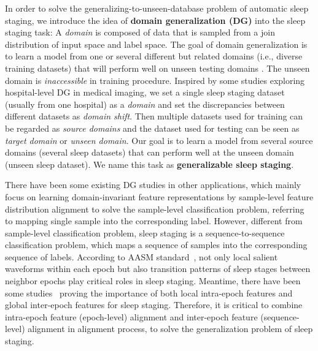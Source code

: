 \documentclass[letterpaper]{article} %
\begin{document}
	In order to solve the generalizing-to-unseen-database problem of automatic sleep staging, we introduce the idea of \textbf{domain generalization (DG)} into the sleep staging task:
	A \textit{domain} is composed of data that is sampled from a join distribution of input space and label space.
	The goal of domain generalization is to learn a model from one or several different but related domains (i.e., diverse training datasets) that will perform well on unseen testing domains \citep{wang2022generalizing}.
	The unseen domain is \textit{inaccessible} in training procedure.
	Inspired by some studies \citep{koh2021wilds, robey2021model} exploring hospital-level DG in medical imaging,
	we set a single sleep staging dataset (usually from one hospital) as a \textit{domain} and set the discrepancies between different datasets as \textit{domain shift}.
	Then multiple datasets used for training can be regarded as \textit{source domains} and the dataset used for testing can be seen as \textit{target domain} or \textit{unseen domain}.
	Our goal is to learn a model from several source domains (several sleep datasets) that can perform well at the unseen domain (unseen sleep dataset). We name this task as \textbf{generalizable sleep staging}.
	
	There have been some existing DG studies \citep{muandet2013domain, li2018domain, li2018dg, matsuura2020domain, zhou2020domain} in other applications, which mainly focus on learning domain-invariant feature representations by sample-level feature distribution alignment to solve the sample-level classification problem, referring to mapping single sample into the corresponding label.
	However, different from sample-level classification problem, sleep staging is a sequence-to-sequence classification problem, which maps a sequence of samples into the corresponding sequence of labels.
	According to AASM standard~\citep{Iber2007TheAA}, not only local salient waveforms within each epoch but also transition patterns of sleep stages between neighbor epochs play critical roles in sleep staging. Meantime, there have been some studies~\citep{Eldele2021AnAD, Phan2021XSleepNetMS} proving the importance of both local intra-epoch features and global inter-epoch features for sleep staging.
	Therefore, it is critical to combine intra-epoch feature (epoch-level) alignment and inter-epoch feature (sequence-level) alignment in alignment process, to solve the generalization problem of sleep staging.
	
\end{document}
